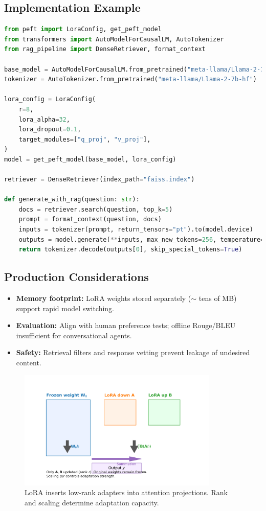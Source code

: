 \documentclass{article}
\begin{document}
\subsection{Implementation Example}
\begin{lstlisting}[language=Python, caption={LoRA fine-tuning with retrieval-augmented prompting (Hugging Face PEFT).}]
from peft import LoraConfig, get_peft_model
from transformers import AutoModelForCausalLM, AutoTokenizer
from rag_pipeline import DenseRetriever, format_context

base_model = AutoModelForCausalLM.from_pretrained("meta-llama/Llama-2-7b-hf", device_map="auto")
tokenizer = AutoTokenizer.from_pretrained("meta-llama/Llama-2-7b-hf")

lora_config = LoraConfig(
    r=8,
    lora_alpha=32,
    lora_dropout=0.1,
    target_modules=["q_proj", "v_proj"],
)
model = get_peft_model(base_model, lora_config)

retriever = DenseRetriever(index_path="faiss.index")

def generate_with_rag(question: str):
    docs = retriever.search(question, top_k=5)
    prompt = format_context(question, docs)
    inputs = tokenizer(prompt, return_tensors="pt").to(model.device)
    outputs = model.generate(**inputs, max_new_tokens=256, temperature=0.7)
    return tokenizer.decode(outputs[0], skip_special_tokens=True)
\end{lstlisting}

\subsection{Production Considerations}
\begin{itemize}
  \item \textbf{Memory footprint:} LoRA weights stored separately ($\sim$ tens of MB) support rapid model switching.
  \item \textbf{Evaluation:} Align with human preference tests; offline Rouge/BLEU insufficient for conversational agents.
  \item \textbf{Safety:} Retrieval filters and response vetting prevent leakage of undesired content.
\end{itemize}

\begin{figure}[H]
  \centering
  \includegraphics[width=0.85\textwidth]{lora_rank_update.png}
  \caption{LoRA inserts low-rank adapters into attention projections. Rank and scaling determine adaptation capacity.}
  \label{fig:lora_rank_update}
\end{figure}
\end{document}
